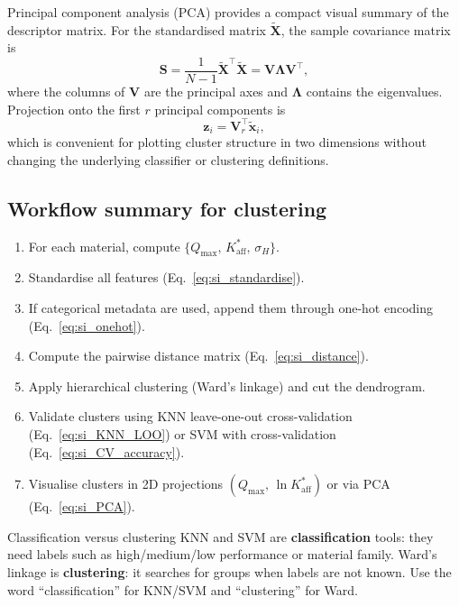 \documentclass[journal=jacsat,manuscript=article]{achemso}
\begin{document}
Principal component analysis (PCA) provides a compact visual summary of
the descriptor matrix. For the standardised matrix
$\tilde{\mathbf{X}}$, the sample covariance matrix is
\begin{equation}
	\mathbf{S}
	=
	\frac{1}{N-1}\tilde{\mathbf{X}}^\top \tilde{\mathbf{X}}
	=
	\mathbf{V}\boldsymbol{\Lambda}\mathbf{V}^\top,
	\label{eq:si_PCA_cov}
\end{equation}
where the columns of $\mathbf{V}$ are the principal axes and
$\boldsymbol{\Lambda}$ contains the eigenvalues. Projection onto the
first $r$ principal components is
\begin{equation}
	\mathbf{z}_i = \mathbf{V}_r^\top \tilde{\mathbf{x}}_i,
	\label{eq:si_PCA}
\end{equation}
which is convenient for plotting cluster structure in two dimensions
without changing the underlying classifier or clustering definitions.

\subsection{Workflow summary for clustering}
\label{sec:si_clustering_workflow}

\begin{enumerate}
	\item For each material, compute
	$\{Q_{\max},\, K_{\mathrm{aff}}^{\ast},\, \sigma_H\}$.
	\item Standardise all features (Eq.~\ref{eq:si_standardise}).
	\item If categorical metadata are used, append them through one-hot
	encoding (Eq.~\ref{eq:si_onehot}).
	\item Compute the pairwise distance matrix
	(Eq.~\ref{eq:si_distance}).
	\item Apply hierarchical clustering (Ward's linkage) and cut
	the dendrogram.
	\item Validate clusters using KNN leave-one-out cross-validation
	(Eq.~\ref{eq:si_KNN_LOO}) or SVM with cross-validation
	(Eq.~\ref{eq:si_CV_accuracy}).
	\item Visualise clusters in 2D projections
	$(Q_{\max},\, \ln K_{\mathrm{aff}}^{\ast})$ or via PCA
	(Eq.~\ref{eq:si_PCA}).
\end{enumerate}

\begin{bluebox}{Classification versus clustering}
	KNN and SVM are \textbf{classification} tools: they need labels such
	as high/medium/low performance or material family. Ward's linkage is
	\textbf{clustering}: it searches for groups when labels are not known.
	Use the word ``classification'' for KNN/SVM and ``clustering'' for
	Ward.
\end{bluebox}
\end{document}

